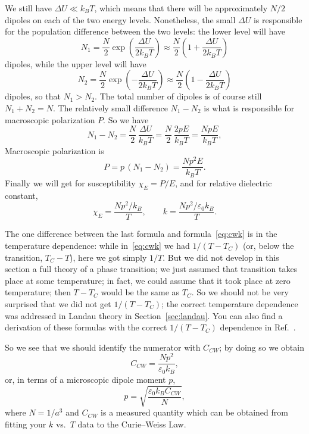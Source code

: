 \documentclass[11pt,a4paper]{article}
\begin{document}
We still have $\Delta U \ll k_BT$, which means that there will be approximately $N/2$
dipoles on each of the two energy levels. Nonetheless, the small $\Delta U$ is
responsible for the population difference between the two levels: the lower level will
have
\begin{equation}
  N_1 = \frac{N}{2}\exp\!\left(\frac{\Delta U}{2k_BT}\right)
      \approx \frac{N}{2}\left(1 + \frac{\Delta U}{2k_BT}\right)
\end{equation}
dipoles, while the upper level will have
\begin{equation}
  N_2 = \frac{N}{2}\exp\!\left(-\frac{\Delta U}{2k_BT}\right)
      \approx \frac{N}{2}\left(1 - \frac{\Delta U}{2k_BT}\right)
\end{equation}
dipoles, so that $N_1 > N_2$. The total number of dipoles is of course still
$N_1 + N_2 = N$. The relatively small difference $N_1 - N_2$ is what is responsible
for macroscopic polarization $P$. So we have
\begin{equation}
  N_1 - N_2 = \frac{N}{2}\,\frac{\Delta U}{k_BT}
            = \frac{N}{2}\,\frac{2pE}{k_BT}
            = \frac{NpE}{k_BT},
\end{equation}
Macroscopic polarization is
\begin{equation}
  P = p\,(N_1 - N_2) = \frac{N p^{2} E}{k_B T}.
\end{equation}
Finally we will get for susceptibility $\chi_E = P/E$, and for relative dielectric
constant,
\begin{equation}
  \chi_E = \frac{N p^{2}/k_B}{T},
  \qquad
  k = \frac{N p^{2}/\varepsilon_0 k_B}{T}.
\end{equation}

The one difference between the last formula and formula~\eqref{eq:cwk} is in the
temperature dependence: while in~\eqref{eq:cwk} we had $1/(T - T_C)$ (or, below the
transition, $T_C - T$), here we got simply $1/T$. But we did not develop in this
section a full theory of a phase transition; we just assumed that transition takes
place at some temperature; in fact, we could assume that it took place at zero
temperature; then $T - T_C$ would be the same as $T_C$. So we should not be very
surprised that we did not get $1/(T - T_C)$; the correct temperature dependence was
addressed in Landau theory in Section~\ref{sec:landau}. You can also find a
derivation of these formulas with the correct $1/(T - T_C)$ dependence in
Ref.~\cite{ref:papon}.

So we see that we should identify the numerator with $C_{CW}$; by doing so we obtain
\begin{equation}\label{eq:ccw}
  C_{CW} = \frac{N p^{2}}{\varepsilon_0 k_B},
\end{equation}
or, in terms of a microscopic dipole moment $p$,
\begin{equation}\label{eq:pfromccw}
  p = \sqrt{\frac{\varepsilon_0 k_B C_{CW}}{N}},
\end{equation}
where $N = 1/a^3$ and $C_{CW}$ is a measured quantity which can be obtained from
fitting your $k$ vs.\ $T$ data to the Curie--Weiss Law.
\end{document}
